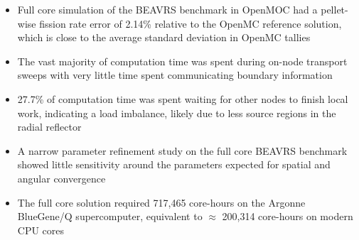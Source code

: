 \vfill
\begin{highlightsbox}[frametitle=Highlights]
\begin{itemize}
  \item Full core simulation of the BEAVRS benchmark in OpenMOC had a pellet-wise fission rate error of 2.14\% relative to the OpenMC reference solution, which is close to the average standard deviation in OpenMC tallies
  
  \item The vast majority of computation time was spent during on-node transport sweeps with very little time spent communicating boundary information
  
  \item 27.7\% of computation time was spent waiting for other nodes to finish local work, indicating a load imbalance, likely due to less source regions in the radial reflector
  
  \item A narrow parameter refinement study on the full core BEAVRS benchmark showed little sensitivity around the parameters expected for spatial and angular convergence
  
  \item The full core solution required 717,465 core-hours on the Argonne BlueGene/Q supercomputer, equivalent to $\approx$ 200,314 core-hours on modern CPU cores
\end{itemize}
\end{highlightsbox}
\vfill
